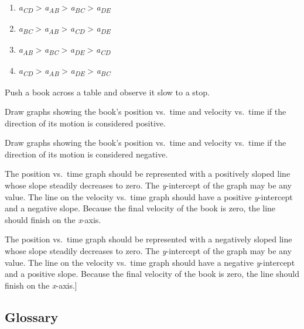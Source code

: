\documentclass[
]{book}
\providecommand{\tightlist}{%
  \setlength{\itemsep}{0pt}\setlength{\parskip}{0pt}}
\begin{document}
\begin{enumerate}
\def\labelenumi{\alph{enumi}.}
\tightlist
\item
  \emph{a\textsubscript{CD}} \textgreater{} \emph{a\textsubscript{AB}} \textgreater{} \emph{a\textsubscript{BC}} \textgreater{} \emph{a\textsubscript{DE}}
\item
  \emph{a\textsubscript{BC}} \textgreater{} \emph{a\textsubscript{AB}} \textgreater{} \emph{a\textsubscript{CD}} \textgreater{} \emph{a\textsubscript{DE}}
\item
  \emph{a\textsubscript{AB}} \textgreater{} \emph{a\textsubscript{BC}} \textgreater{} \emph{a\textsubscript{DE}} \textgreater{} \emph{a\textsubscript{CD}}
\item
  \emph{a\textsubscript{CD}} \textgreater{} \emph{a\textsubscript{AB}} \textgreater{} \emph{a\textsubscript{DE}} \textgreater{} \emph{a\textsubscript{BC}}
\end{enumerate}

\hypertarget{fs-id1860126}{}
\leavevmode{}%
Push a book across a table and observe it slow to a stop.

Draw graphs showing the book's position vs.~time and velocity vs.~time
if the direction of its motion is considered positive.

Draw graphs showing the book's position vs.~time and velocity vs.~time
if the direction of its motion is considered negative.

\leavevmode{}%
The position vs.~time graph should be represented with a positively
sloped line whose slope steadily decreases to zero. The \emph{y}-intercept of
the graph may be any value. The line on the velocity vs.~time graph
should have a positive \emph{y}-intercept and a negative slope. Because the
final velocity of the book is zero, the line should finish on the
\emph{x}-axis.

The position vs.~time graph should be represented with a negatively
sloped line whose slope steadily decreases to zero. The \emph{y}-intercept of
the graph may be any value. The line on the velocity vs.~time graph
should have a negative \emph{y}-intercept and a positive slope. Because the
final velocity of the book is zero, the line should finish on the
\emph{x}-axis.{]}

\hypertarget{glossary-3}{%
\subsection{Glossary}\label{glossary-3}}
\end{document}
